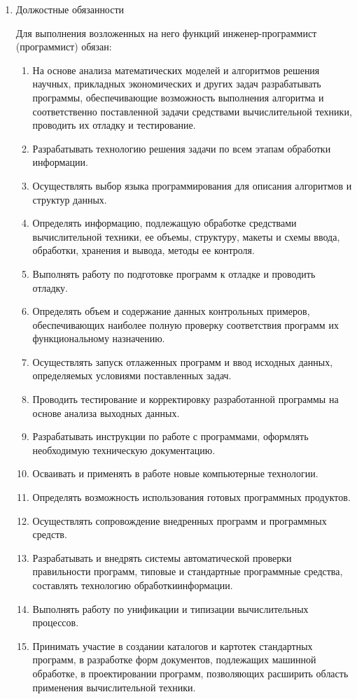 \documentclass[12pt,a4paper,draft]{belgost/belgost}
\begin{document}
\begin{enumerate}
    \item Должостные обязанности

    Для выполнения возложенных на него функций инженер-программист (программист) обязан:
    \begin{enumerate}
        \item На основе анализа математических моделей и алгоритмов решения научных, прикладных экономических и других задач разрабатывать программы, обеспечивающие возможность выполнения алгоритма и соответственно поставленной задачи средствами вычислительной техники, проводить их отладку и тестирование.
        \item Разрабатывать технологию решения задачи по всем этапам обработки информации.
        \item Осуществлять выбор языка программирования для описания алгоритмов и структур данных.
        \item Определять информацию, подлежащую обработке средствами вычислительной техники, ее объемы, структуру, макеты и схемы ввода, обработки, хранения и вывода, методы ее контроля.
        \item Выполнять работу по подготовке программ к отладке и проводить отладку.
        \item Определять объем и содержание данных контрольных примеров, обеспечивающих наиболее полную проверку соответствия программ их функциональному назначению.
        \item Осуществлять запуск отлаженных программ и ввод исходных данных, определяемых условиями поставленных задач.
        \item Проводить тестирование и корректировку разработанной программы на основе анализа выходных данных.
        \item Разрабатывать инструкции по работе с программами, оформлять необходимую техническую документацию.
        \item Осваивать и применять в работе новые компьютерные технологии.
        \item Определять возможность использования готовых программных продуктов.
        \item Осуществлять сопровождение внедренных программ и программных средств.
        \item Разрабатывать и внедрять системы автоматической проверки правильности программ, типовые и стандартные программные средства, составлять технологию обработкиинформации.
        \item Выполнять работу по унификации и типизации вычислительных процессов.
        \item Принимать участие в создании каталогов и картотек стандартных программ, в разработке форм документов, подлежащих машинной обработке, в проектировании программ, позволяющих расширить область применения вычислительной техники.
    \end{enumerate}


\end{enumerate}
\end{document}
